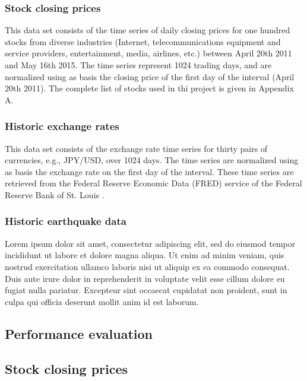 \documentclass{article}
\begin{document}
\subsubsection{Stock closing prices}

This data set consists of the time series of daily closing prices for one hundred stocks from diverse industries (Internet, telecommunications equipment and service providers, entertainment, media, airlines, etc.) between April 20th 2011 and May 16th 2015. The time series represent 1024 trading days, and are normalized using as basis the closing price of the first day of the interval (April 20th 2011). The complete list of stocks used in thi project is given in Appendix A.

\subsubsection{Historic exchange rates}

This data set consists of the exchange rate time series for thirty pairs of currencies, e.g., JPY/USD, over 1024 days. The time series are normalized using as basis the exchange rate on the first day of the interval. These time series are retrieved from the Federal Reserve Economic Data (FRED) service of the Federal Reserve Bank of St. Louis \cite{FRED15}.


\subsubsection{Historic earthquake data}

Lorem ipsum dolor sit amet, consectetur adipiscing elit, sed do eiusmod tempor incididunt ut labore et dolore magna aliqua. Ut enim ad minim veniam, quis nostrud exercitation ullamco laboris nisi ut aliquip ex ea commodo consequat. Duis aute irure dolor in reprehenderit in voluptate velit esse cillum dolore eu fugiat nulla pariatur. Excepteur sint occaecat cupidatat non proident, sunt in culpa qui officia deserunt mollit anim id est laborum.



\subsection{Performance evaluation}

\subsection{Stock closing prices}
\end{document}
